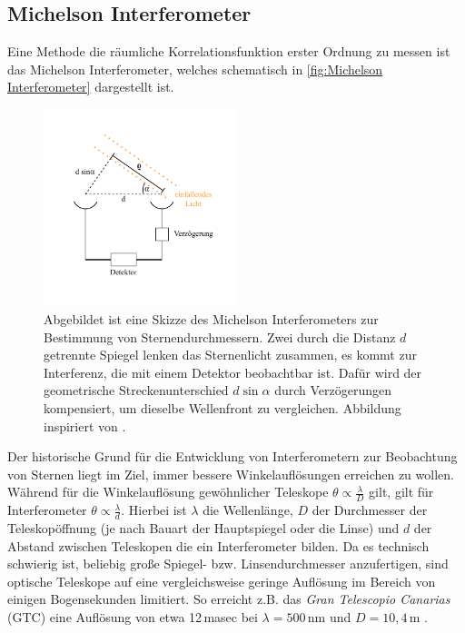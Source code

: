 \subsection{Michelson Interferometer}
\label{ssec:Michelson Interferometer}
Eine Methode die räumliche Korrelationsfunktion erster Ordnung zu messen ist das Michelson Interferometer, welches schematisch in \autoref{fig:Michelson Interferometer} dargestellt ist. 
\begin{figure}[htbp]
    \centering
    \includegraphics[width=0.5\textwidth]{images/Theorie/Michelson_Interferometer.pdf}
    \caption{Abgebildet ist eine Skizze des Michelson Interferometers zur Bestimmung von Sternendurchmessern. Zwei durch die Distanz $d$ getrennte Spiegel lenken das Sternenlicht zusammen, es kommt zur Interferenz, die mit einem Detektor beobachtbar ist. Dafür wird der geometrische Streckenunterschied $d\sin\alpha$ durch Verzögerungen kompensiert, um dieselbe Wellenfront zu vergleichen. Abbildung inspiriert von \cite[Fig. 1]{foellmiIntensityInterferometrySecondorder2009}.}
    \label{fig:Michelson Interferometer}
\end{figure}
Der historische Grund für die Entwicklung von Interferometern zur Beobachtung von Sternen liegt im Ziel, immer bessere Winkelauflösungen erreichen zu wollen. 
Während für die Winkelauflösung gewöhnlicher Teleskope $\theta \propto \frac{\lambda}{D}$ gilt, gilt für Interferometer $\theta \propto \frac{\lambda}{d}$. 
Hierbei ist $\lambda$ die Wellenlänge, $D$ der Durchmesser der Teleskopöffnung (je nach Bauart der Hauptspiegel oder die Linse) und $d$ der Abstand zwischen Teleskopen die ein Interferometer bilden. 
Da es technisch schwierig ist, beliebig große Spiegel- bzw. Linsendurchmesser anzufertigen, sind optische Teleskope auf eine vergleichsweise geringe Auflösung im Bereich von einigen Bogensekunden limitiert. 
So erreicht z.B. das \emph{Gran Telescopio Canarias} (GTC) eine Auflösung von etwa 12\,masec bei $\lambda=500\,\mathrm{nm}$ und $D=10,4\,\mathrm{m}$ \cite{GranTelescopioCANARIAS}. 

